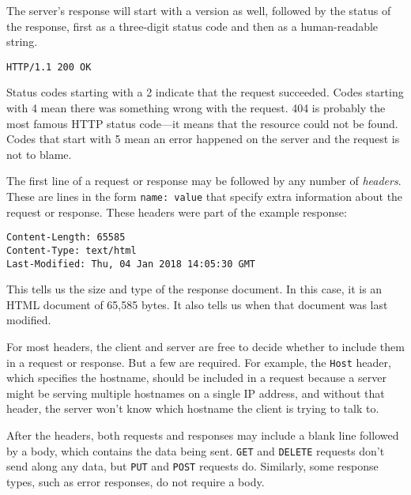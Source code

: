 The server's response will start with a version as well, followed by the status of the response, first as a three-digit status code and then as a human-readable string.

\begin{lstlisting}
HTTP/1.1 200 OK
\end{lstlisting}
\noindent{}

Status codes starting with a 2 indicate that the request succeeded. Codes starting with 4 mean there was something wrong with the request. 404 is probably the most famous HTTP status code—it means that the resource could not be found. Codes that start with 5 mean an error happened on the server and the request is not to blame.

\label{http.headers}The first line of a request or response may be followed by any number of \emph{headers}. These are lines in the form \lstinline`name: value` that specify extra information about the request or response. These headers were part of the example response:

\begin{lstlisting}
Content-Length: 65585
Content-Type: text/html
Last-Modified: Thu, 04 Jan 2018 14:05:30 GMT
\end{lstlisting}
\noindent{}

This tells us the size and type of the response document. In this case, it is an HTML document of 65,585 bytes. It also tells us when that document was last modified.

For most headers, the client and server are free to decide whether to include them in a request or response. But a few are required. For example, the \lstinline`Host` header, which specifies the hostname, should be included in a request because a server might be serving multiple hostnames on a single IP address, and without that header, the server won't know which hostname the client is trying to talk to.

After the headers, both requests and responses may include a blank line followed by a body, which contains the data being sent. \lstinline`GET` and \lstinline`DELETE` requests don't send along any data, but \lstinline`PUT` and \lstinline`POST` requests do. Similarly, some response types, such as error responses, do not require a body.

